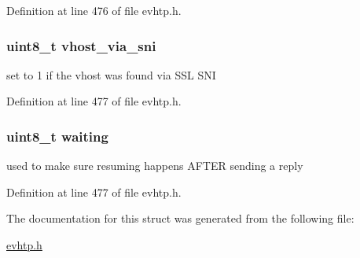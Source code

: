 Definition at line 476 of file evhtp.\-h.

\hypertarget{structevhtp__connection__s_a7f7e7921437e13781ac277814b976590}{
\subsubsection[{vhost\-\_\-via\-\_\-sni}]{\setlength{\rightskip}{0pt plus 5cm}uint8\-\_\-t vhost\-\_\-via\-\_\-sni}}\label{structevhtp__connection__s_a7f7e7921437e13781ac277814b976590}
set to 1 if the vhost was found via S\-S\-L S\-N\-I 

Definition at line 477 of file evhtp.\-h.

\hypertarget{structevhtp__connection__s_ae6d06630954ffc71a965ae0b8e2a627a}{
\subsubsection[{waiting}]{\setlength{\rightskip}{0pt plus 5cm}uint8\-\_\-t waiting}}\label{structevhtp__connection__s_ae6d06630954ffc71a965ae0b8e2a627a}
used to make sure resuming happens A\-F\-T\-E\-R sending a reply 

Definition at line 477 of file evhtp.\-h.



The documentation for this struct was generated from the following file\-:\begin{DoxyCompactItemize}
\item 
\hyperlink{evhtp_8h}{evhtp.\-h}\end{DoxyCompactItemize}
